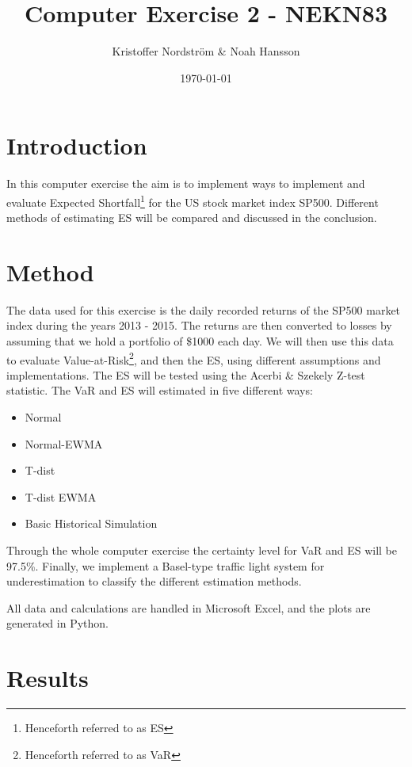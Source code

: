 \documentclass[a4paper]{article}
\title{Computer Exercise 2 - NEKN83}
\author{Kristoffer Nordström \& Noah Hansson}
\date{\today}
\begin{document}
\maketitle


\section{Introduction}
In this computer exercise the aim is to implement ways to implement and evaluate Expected Shortfall\footnote{Henceforth referred to as ES} for the US stock market index SP500. Different methods of estimating ES will be compared and discussed in the conclusion.

\section{Method}
The data used for this exercise is the daily recorded returns of the SP500 market index during the years 2013 - 2015. The returns are then converted to losses by assuming that we hold a portfolio of \$1000 each day. We will then use this data to evaluate Value-at-Risk\footnote{Henceforth referred to as VaR}, and then the ES, using different assumptions and implementations. The ES will be tested using the Acerbi \& Szekely Z-test statistic. The VaR and ES will estimated in five different ways:
\begin{itemize}
    \item Normal
    \item Normal-EWMA
    \item T-dist
    \item T-dist EWMA
    \item Basic Historical Simulation
\end{itemize}
Through the whole computer exercise the certainty level for VaR and ES will be 97.5\%. Finally, we implement a Basel-type traffic light system for underestimation to classify the different estimation methods.

All data and calculations are handled in Microsoft Excel, and the plots are generated in Python.

\section{Results}
\end{document}
